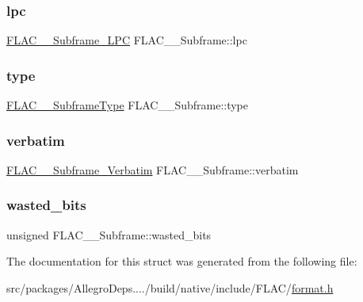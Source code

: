 \subsubsection{\texorpdfstring{lpc}{lpc}}
{\footnotesize\ttfamily \hyperlink{struct_f_l_a_c_____subframe___l_p_c}{F\+L\+A\+C\+\_\+\+\_\+\+Subframe\+\_\+\+L\+PC} F\+L\+A\+C\+\_\+\+\_\+\+Subframe\+::lpc}

\mbox{\label{struct_f_l_a_c_____subframe_a1de133ee69f416636e24a990d4bd6b44}} 
\subsubsection{\texorpdfstring{type}{type}}
{\footnotesize\ttfamily \hyperlink{group__flac__format_ga1f431eaf213e74d7747589932d263348}{F\+L\+A\+C\+\_\+\+\_\+\+Subframe\+Type} F\+L\+A\+C\+\_\+\+\_\+\+Subframe\+::type}

\mbox{\label{struct_f_l_a_c_____subframe_ae7b7d3263298a9326f3ac3e9d56b2a6c}} 
\subsubsection{\texorpdfstring{verbatim}{verbatim}}
{\footnotesize\ttfamily \hyperlink{struct_f_l_a_c_____subframe___verbatim}{F\+L\+A\+C\+\_\+\+\_\+\+Subframe\+\_\+\+Verbatim} F\+L\+A\+C\+\_\+\+\_\+\+Subframe\+::verbatim}

\mbox{\label{struct_f_l_a_c_____subframe_a96a6848ded4e90e26d54f0dd7066c306}} 
\subsubsection{\texorpdfstring{wasted\+\_\+bits}{wasted\_bits}}
{\footnotesize\ttfamily unsigned F\+L\+A\+C\+\_\+\+\_\+\+Subframe\+::wasted\+\_\+bits}



The documentation for this struct was generated from the following file\+:\begin{DoxyCompactItemize}
\item 
src/packages/\+Allegro\+Deps..../build/native/include/\+F\+L\+A\+C/\hyperlink{format_8h}{format.\+h}\end{DoxyCompactItemize}
